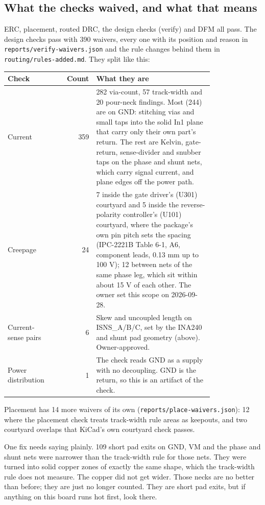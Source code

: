 \subsection*{What the checks waived, and what that means}

ERC, placement, routed DRC, the design checks (verify) and DFM all pass. The
design checks pass with 390 waivers, every one with its position and reason in
\texttt{reports/verify-waivers.json} and the rule changes behind them in
\texttt{routing/rules-added.md}. They split like this:

\begin{center}
{\small
\begin{tabular}{p{0.22\linewidth} r p{0.58\linewidth}}
\hline
Check & Count & What they are \\
\hline
Current & 359 & 282 via-count, 57 track-width and 20 pour-neck findings. Most (244)
are on GND: stitching vias and small taps into the solid In1 plane that carry
only their own part's return. The rest are Kelvin, gate-return, sense-divider
and snubber taps on the phase and shunt nets, which carry signal current,
and plane edges off the power path. \\
Creepage & 24 & 7 inside the gate driver's (U301) courtyard and 5 inside the
reverse-polarity controller's (U101) courtyard, where the package's own pin
pitch sets the spacing (IPC-2221B Table 6-1, A6, component leads, 0.13 mm up to
100 V); 12 between nets of the same phase leg, which sit within about 15 V of each
other. The owner set this scope on 2026-09-28. \\
Current-sense pairs & 6 & Skew and uncoupled length on ISNS\_A/B/C, set by the
INA240 and shunt pad geometry (above). Owner-approved. \\
Power distribution & 1 & The check reads GND as a supply with no decoupling. GND
is the return, so this is an artifact of the check. \\
\hline
\end{tabular}}
\end{center}

Placement has 14 more waivers of its own (\texttt{reports/place-waivers.json}):
12 where the placement check treats track-width rule areas as keepouts, and two
courtyard overlaps that KiCad's own courtyard check passes.

One fix needs saying plainly. 109 short pad exits on GND, VM and the phase and
shunt nets were narrower than the track-width rule for those nets. They were
turned into solid copper zones of exactly the same shape, which the track-width
rule does not measure. The copper did not get wider. Those necks are no better
than before; they are just no longer counted. They are short pad exits, but if
anything on this board runs hot first, look there.

